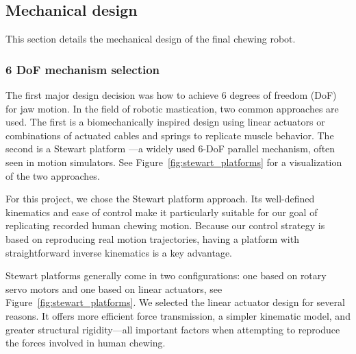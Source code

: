 \subsection{Mechanical design}

This section details the mechanical design of the final chewing robot.

\subsubsection{6 DoF mechanism selection}

The first major design decision was how to achieve 6 degrees of freedom (DoF) for jaw motion. In the field of robotic mastication, two common approaches 
are used. The first is a biomechanically inspired design using linear actuators \cite{ChewingRobotLinearActuator} or combinations of actuated cables and 
springs \cite{ChewingRobotGums} to replicate muscle behavior. The second is a Stewart platform \cite{BristolChewingRobot}—a widely used 6-DoF parallel mechanism, often seen in 
motion simulators. See Figure~\ref{fig:stewart_platforms} for a visualization of the two approaches.

For this project, we chose the Stewart platform approach. Its well-defined kinematics and ease of control make it particularly suitable for our goal of 
replicating recorded human chewing motion. Because our control strategy is based on reproducing real motion trajectories, having a platform with 
straightforward inverse kinematics is a key advantage.

Stewart platforms generally come in two configurations: one based on rotary servo motors and one based on linear actuators, see Figure~\ref{fig:stewart_platforms}. 
We selected the linear actuator design for several reasons. It offers more efficient force transmission, a simpler kinematic model, and greater structural 
rigidity—all important factors when attempting to reproduce the forces involved in human chewing.

